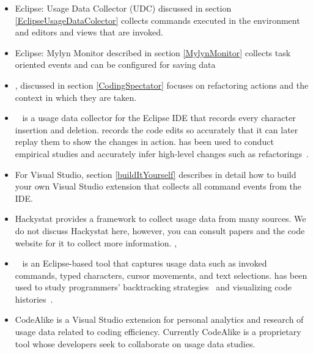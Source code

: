 \begin{itemize}

	\item Eclipse: Usage Data Collector (UDC) discussed in section \ref{EclipseUsageDataColector} collects commands executed in the environment and editors and views that are invoked.
	
	\item Eclipse: Mylyn Monitor described in section \ref{MylynMonitor} collects task oriented events and can be configured for saving data
	
        \item \CodingSpectator %
, discussed in section \ref{CodingSpectator} focuses on refactoring actions and the context in which they are taken.

        \item \CodingTracker~\cite{NegaraETAL2012Dangerous} is a usage data collector for the Eclipse IDE that records every character insertion and deletion. \CodingTracker{} records the code edits so accurately that it can later replay them to show the changes in action. \CodingTracker{} has been used to conduct empirical studies and accurately infer high-level changes such as refactorings~\cite{NegaraETAL2013ManualRefactorings}.
	
	\item For Visual Studio, section \ref{buildItYourself} describes in detail how to build your own Visual Studio extension that collects all command events from the IDE.
	
	\item Hackystat provides a framework to collect usage data from many sources.  We do not discuss Hackystat here, however, you can consult papers and the code website for it to collect more information. \cite{V:johnson2003beyond}, %

        \item \Fluorite~\cite{YoonMyers2011Flourite} is an Eclipse-based tool that captures usage data such as invoked commands, typed characters, cursor movements, and text selections. \Fluorite{} has been used to study programmers' backtracking strategies~\cite{YoonMyers2012Backtracking} and visualizing code histories~\cite{YoonETAL2013VisualizeChange}.
	
	\item CodeAlike is a Visual Studio extension for personal analytics and research of usage data related to coding efficiency.  Currently CodeAlike is a proprietary tool whose developers seek to collaborate on usage data studies.

\end{itemize}

